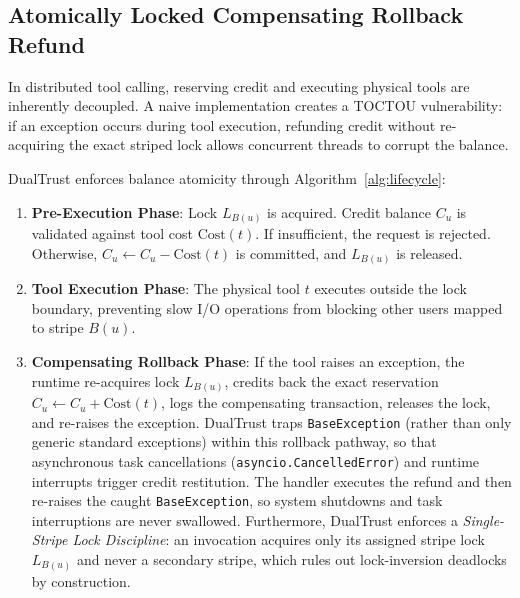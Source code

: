 \documentclass[journal]{IEEEtran}
\begin{document}
\subsection{Atomically Locked Compensating Rollback Refund}
In distributed tool calling, reserving credit and executing physical tools are inherently decoupled. A naive implementation creates a TOCTOU vulnerability: if an exception occurs during tool execution, refunding credit without re-acquiring the exact striped lock allows concurrent threads to corrupt the balance.

DualTrust enforces balance atomicity through Algorithm~\ref{alg:lifecycle}:
\begin{enumerate}[leftmargin=12pt, topsep=2pt, itemsep=1pt]
\item \textbf{Pre-Execution Phase}: Lock $L_{B(u)}$ is acquired. Credit balance $C_u$ is validated against tool cost $\text{Cost}(t)$. If insufficient, the request is rejected. Otherwise, $C_u \leftarrow C_u - \text{Cost}(t)$ is committed, and $L_{B(u)}$ is released.
\item \textbf{Tool Execution Phase}: The physical tool $t$ executes outside the lock boundary, preventing slow I/O operations from blocking other users mapped to stripe $B(u)$.
\item \textbf{Compensating Rollback Phase}: If the tool raises an exception, the runtime re-acquires lock $L_{B(u)}$, credits back the exact reservation $C_u \leftarrow C_u + \text{Cost}(t)$, logs the compensating transaction, releases the lock, and re-raises the exception. DualTrust traps \texttt{BaseException} (rather than only generic standard exceptions) within this rollback pathway, so that asynchronous task cancellations (\texttt{asyncio.CancelledError}) and runtime interrupts trigger credit restitution. The handler executes the refund and then re-raises the caught \texttt{BaseException}, so system shutdowns and task interruptions are never swallowed. Furthermore, DualTrust enforces a \emph{Single-Stripe Lock Discipline}: an invocation acquires only its assigned stripe lock $L_{B(u)}$ and never a secondary stripe, which rules out lock-inversion deadlocks by construction.
\end{enumerate}
\end{document}
